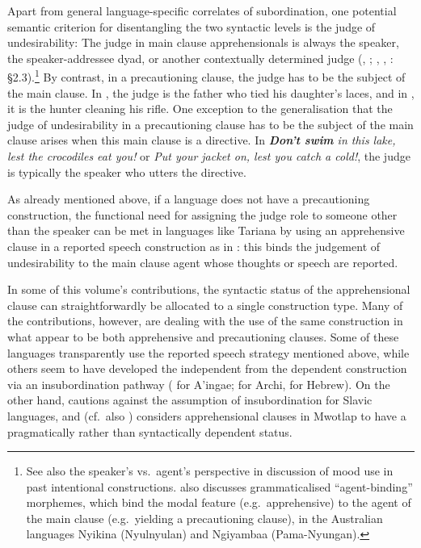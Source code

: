 \documentclass[output=paper,colorlinks,citecolor=brown
]{langscibook}
\begin{document}
Apart from general language-specific correlates of subordination, one potential semantic criterion for disentangling the two syntactic levels is the judge of undesirability: The judge in main clause apprehensionals is always the speaker, the speaker-addressee dyad, or another contextually determined judge (\cite[164--170]{green1989},  \citealt{chapters/fedotov}; \citealt{chapters/francois}, \cite[272--273]{vuillermet2018a}, \citealt{chapters/vuillermet}: \S2.3).\footnote {See also the speaker's vs.\ agent's perspective in  discussion of mood use in past intentional constructions. \citet[68--69]{verstraete2006a} also discusses grammaticalised ``agent-binding'' morphemes, which bind the modal feature (e.g.\ apprehensive) to the agent of the main clause (e.g.\ yielding a precautioning clause), in the Australian languages Nyikina (Nyulnyulan) and Ngiyambaa (Pama-Nyungan).} By contrast, in a precautioning clause, the judge has to be the subject of the main clause. In , the judge is the father who tied his daughter's laces, and in , it is the hunter cleaning his rifle. One exception to the generalisation that the judge of undesirability in a precautioning clause has to be the subject of the main clause arises when this main clause is a directive. In \textit{\textbf{Don't swim}  in this lake, lest the crocodiles eat you!} or \textit{Put your jacket on, lest you catch a cold!}, the judge is typically the speaker who utters the directive.

As already mentioned above, if a language does not have a precautioning construction, the functional need for assigning the judge role to someone other than the speaker can be met in languages like Tariana by using an apprehensive clause in a reported speech construction as in : this binds the judgement of undesirability to the main clause agent whose thoughts or speech are reported. 

In some of this volume's contributions, the syntactic status of the apprehensional clause can straightforwardly be allocated to a single construction type. Many of the contributions, however, are dealing with the use of the same construction in what appear to be both apprehensive and precautioning clauses. Some of these languages transparently use the reported speech strategy mentioned above, while others seem to have developed the independent from the dependent construction via an insubordination pathway (\citeauthor{chapters/dabkowski-anderbois} for A'ingae; \citeauthor{chapters/daniel}  for Archi, \citeauthor{chapters/francez} for Hebrew). On the other hand, \citeauthor{chapters/wiemer} cautions against the assumption of insubordination for Slavic languages, and \citeauthor{chapters/francois}  (cf.\ also \cite{francois2003}) considers apprehensional clauses in Mwotlap to have a pragmatically rather than syntactically dependent status.
\end{document}
